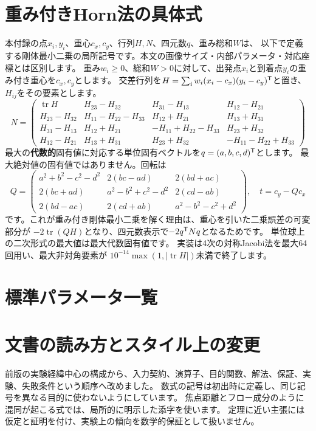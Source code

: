 \documentclass[a4paper,11pt]{ltjsarticle}
\theoremstyle{definition}
\begin{document}
\appendix
\section{重み付きHorn法の具体式}
本付録の点$x_i,y_i$、重心$c_x,c_y$、行列$H,N$、四元数$q$、重み総和$W$は、
以下で定義する剛体最小二乗の局所記号です。本文の画像サイズ・内部パラメータ・対応座標とは区別します。
重み$w_i\ge0$、総和$W>0$に対して、出発点$x_i$と到着点$y_i$の重み付き重心を$c_x,c_y$とします。
交差行列を$H=\sum_i w_i(x_i-c_x)(y_i-c_y)^\mathsf T$と置き、$H_{ij}$をその要素とします。
\begin{equation}
N=\begin{pmatrix}
\operatorname{tr}H&H_{23}-H_{32}&H_{31}-H_{13}&H_{12}-H_{21}\\
H_{23}-H_{32}&H_{11}-H_{22}-H_{33}&H_{12}+H_{21}&H_{13}+H_{31}\\
H_{31}-H_{13}&H_{12}+H_{21}&-H_{11}+H_{22}-H_{33}&H_{23}+H_{32}\\
H_{12}-H_{21}&H_{13}+H_{31}&H_{23}+H_{32}&-H_{11}-H_{22}+H_{33}
\end{pmatrix}
\end{equation}
最大の\textbf{代数的}固有値に対応する単位固有ベクトルを$q=(a,b,c,d)^\mathsf T$とします。
最大絶対値の固有値ではありません。回転は
\begin{equation}
Q=\begin{pmatrix}
a^2+b^2-c^2-d^2&2(bc-ad)&2(bd+ac)\\
2(bc+ad)&a^2-b^2+c^2-d^2&2(cd-ab)\\
2(bd-ac)&2(cd+ab)&a^2-b^2-c^2+d^2
\end{pmatrix},\quad t=c_y-Qc_x
\end{equation}
です。これが重み付き剛体最小二乗を解く理由は、重心を引いた二乗誤差の可変部分が
$-2\operatorname{tr}(QH)$となり、四元数表示で$-2q^\mathsf T Nq$となるためです。
単位球上の二次形式の最大値は最大代数固有値です\cite{horn}。
実装は4次の対称Jacobi法を最大64回用い、最大非対角要素が
$10^{-14}\max(1,|\operatorname{tr}H|)$未満で終了します。

\section{標準パラメータ一覧}

\section{文書の読み方とスタイル上の変更}
前版の実験経緯中心の構成から、入力契約、演算子、目的関数、解法、保証、実験、失敗条件という順序へ改めました。
数式の記号は初出時に定義し、同じ記号を異なる目的に使わないようにしています。
焦点距離とフロー成分のように混同が起こる式では、局所的に明示した添字を使います。
定理に近い主張には仮定と証明を付け、実験上の傾向を数学的保証として扱いません。
\end{document}
